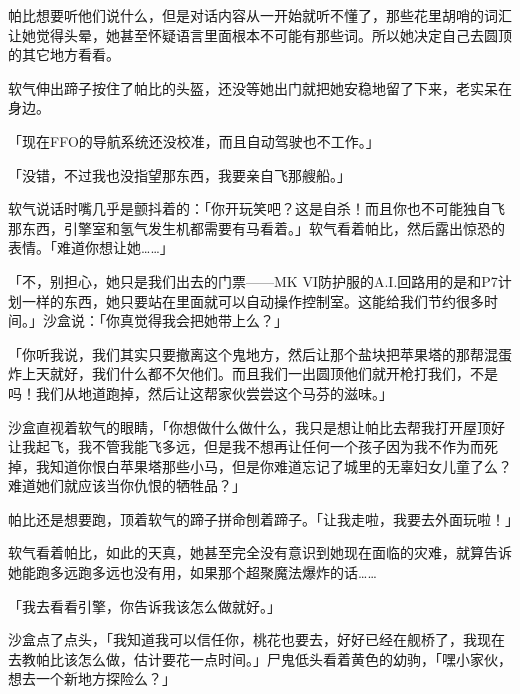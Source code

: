 帕比想要听他们说什么，但是对话内容从一开始就听不懂了，那些花里胡哨的词汇让她觉得头晕，她甚至怀疑语言里面根本不可能有那些词。所以她决定自己去圆顶的其它地方看看。

软气伸出蹄子按住了帕比的头盔，还没等她出门就把她安稳地留了下来，老实呆在身边。

「现在FFO的导航系统还没校准，而且自动驾驶也不工作。」

「没错，不过我也没指望那东西，我要亲自飞那艘船。」

软气说话时嘴几乎是颤抖着的：「你开玩笑吧？这是自杀！而且你也不可能独自飞那东西，引擎室和氢气发生机都需要有马看着。」软气看着帕比，然后露出惊恐的表情。「难道你想让她……」

「不，别担心，她只是我们出去的门票——MK VI防护服的A.I.回路用的是和P7计划一样的东西，她只要站在里面就可以自动操作控制室。这能给我们节约很多时间。」沙盒说：「你真觉得我会把她带上么？」

「你听我说，我们其实只要撤离这个鬼地方，然后让那个盐块把苹果塔的那帮混蛋炸上天就好，我们什么都不欠他们。而且我们一出圆顶他们就开枪打我们，不是吗！我们从地道跑掉，然后让这帮家伙尝尝这个马芬的滋味。」

沙盒直视着软气的眼睛，「你想做什么做什么，我只是想让帕比去帮我打开屋顶好让我起飞，我不管我能飞多远，但是我不想再让任何一个孩子因为我不作为而死掉，我知道你恨白苹果塔那些小马，但是你难道忘记了城里的无辜妇女儿童了么？难道她们就应该当你仇恨的牺牲品？」

帕比还是想要跑，顶着软气的蹄子拼命刨着蹄子。「让我走啦，我要去外面玩啦！」

软气看着帕比，如此的天真，她甚至完全没有意识到她现在面临的灾难，就算告诉她能跑多远跑多远也没有用，如果那个超聚魔法爆炸的话……

「我去看看引擎，你告诉我该怎么做就好。」

沙盒点了点头，「我知道我可以信任你，桃花也要去，好好已经在舰桥了，我现在去教帕比该怎么做，估计要花一点时间。」尸鬼低头看着黄色的幼驹，「嘿小家伙，想去一个新地方探险么？」

\horizonline







